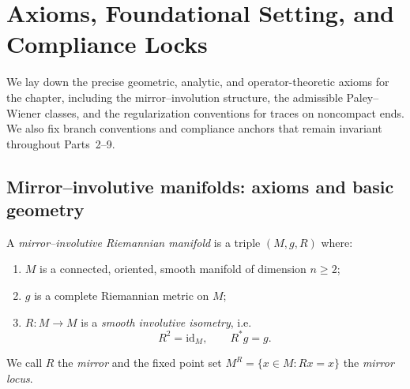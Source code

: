 
\section{Axioms, Foundational Setting, and Compliance Locks}
\label{sec:ch6-part1-axioms} \relax \hspace{0pt}

 We lay down the precise geometric, analytic, and operator-theoretic axioms for the chapter, including the mirror–involution structure, the admissible Paley–Wiener classes, and the regularization conventions for traces on noncompact ends. We also fix branch conventions and compliance anchors that remain invariant throughout Parts~2–9. %
\FlowBreaker

\subsection{Mirror–involutive manifolds: axioms and basic geometry}
\label{subsec:ch6-part1-mirror-axioms} \relax

\begin{definition}
\label{def:mirror-manifold}
A \emph{mirror–involutive Riemannian manifold} is a triple $(M,g,R)$ where:
\begin{enumerate}[label=(\roman*), leftmargin=*, itemsep=2pt]
  \item $M$ is a connected, oriented, smooth manifold of dimension $n\ge 2$; %
  \item $g$ is a complete Riemannian metric on $M$; %
  \item $R:M\to M$ is a \emph{smooth involutive isometry}, i.e.
  \[
  R^2=\mathrm{id}_M,\qquad R^*g=g.
  \]
\end{enumerate}
We call $R$ the \emph{mirror} and the fixed point set $M^R=\{x\in M:Rx=x\}$ the \emph{mirror locus}.
\end{definition}

